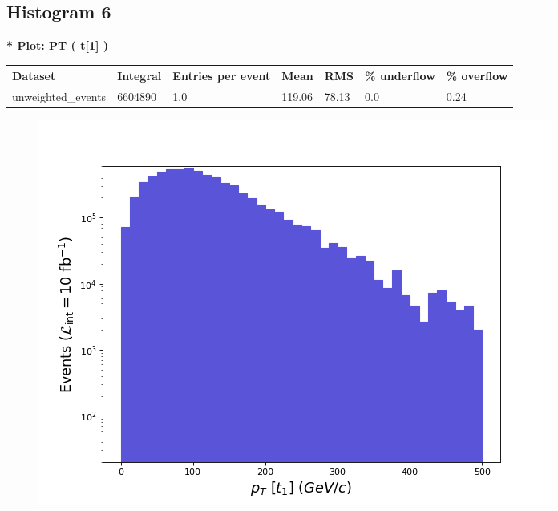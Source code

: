 \documentclass[a4paper, 10pt]{article}
\begin{document}
\subsection{ Histogram 6}

\textbf{* Plot: PT ( t[1] ) }\\
   \begin{table}[H]
  \begin{center}
    \begin{tabular}{|m{23.0mm}|m{23.0mm}|m{18.0mm}|m{19.0mm}|m{19.0mm}|m{19.0mm}|m{19.0mm}|}
      \hline
      {\cellcolor{yellow}         Dataset}& {\cellcolor{yellow}         Integral}& {\cellcolor{yellow}         Entries per event}& {\cellcolor{yellow}         Mean}& {\cellcolor{yellow}         RMS}& {\cellcolor{yellow}         \% underflow}& {\cellcolor{yellow}         \% overflow}\\
      \hline
      {\cellcolor{white}         unweighted\_events}& {\cellcolor{white}         6604890}& {\cellcolor{white}         1.0}& {\cellcolor{white}         119.06}& {\cellcolor{white}         78.13}& {\cellcolor{green}         0.0}& {\cellcolor{green}         0.24}\\
\hline
    \end{tabular}
  \end{center}
\end{table}

\begin{figure}[H]
  \begin{center}
    \includegraphics[scale=0.45]{selection_5.png}\\
\caption{   }
  \end{center}
\end{figure}
      \newpage
\end{document}
